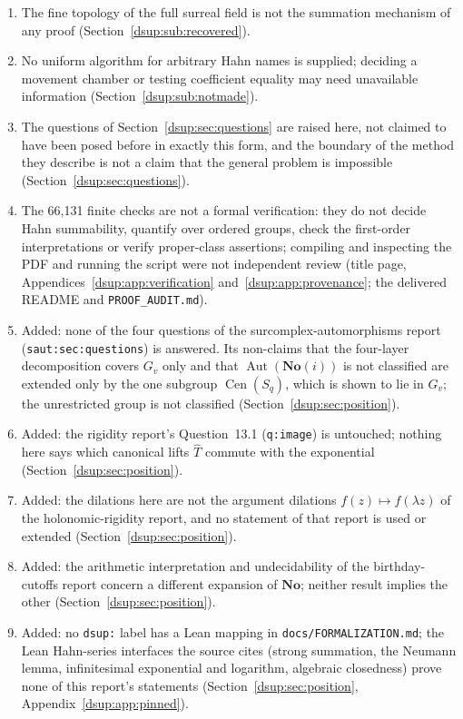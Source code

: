 \documentclass[11pt,oneside]{article}
\numberwithin{equation}{section}
\theoremstyle{definition}
\theoremstyle{remark}
\newcommand{\No}{\mathbf{No}}
\newcommand{\Aut}{\operatorname{Aut}}
\DeclareMathOperator{\Cen}{Cen}
\newcommand{\repo}[1]{\nolinkurl{#1}}%
\newcommand{\lbl}[1]{\nolinkurl{#1}}%
\begin{document}
\begin{enumerate}[label=\arabic*.,leftmargin=2.2em,itemsep=2pt]
\item The fine topology of the full surreal field is not the summation
mechanism of any proof (Section~\ref{dsup:sub:recovered}).
\item No uniform algorithm for arbitrary Hahn names is supplied; deciding a
movement chamber or testing coefficient equality may need unavailable
information (Section~\ref{dsup:sub:notmade}).
\item The questions of Section~\ref{dsup:sec:questions} are raised here, not
claimed to have been posed before in exactly this form, and the boundary of
the method they describe is not a claim that the general problem is
impossible (Section~\ref{dsup:sec:questions}).
\item The 66,131 finite checks are not a formal verification: they do not
decide Hahn summability, quantify over ordered groups, check the
first-order interpretations or verify proper-class assertions; compiling
and inspecting the PDF and running the script were not independent review
(title page, Appendices~\ref{dsup:app:verification}
and~\ref{dsup:app:provenance}; the delivered README and
\repo{PROOF_AUDIT.md}).
\item Added: none of the four questions of the surcomplex-automorphisms
report (\lbl{saut:sec:questions}) is answered. Its non-claims that the
four-layer decomposition covers $G_v$ only and that $\Aut(\No(i))$ is not
classified are extended only by the one subgroup $\Cen(S_q)$, which is
shown to lie in $G_v$; the unrestricted group is not classified
(Section~\ref{dsup:sec:position}).
\item Added: the rigidity report's Question~13.1 (\lbl{q:image}) is
untouched; nothing here says which canonical lifts $\widehat T$ commute with
the exponential (Section~\ref{dsup:sec:position}).
\item Added: the dilations here are not the argument dilations
$f(z)\mapsto f(\lambda z)$ of the holonomic-rigidity report, and no
statement of that report is used or extended
(Section~\ref{dsup:sec:position}).
\item Added: the arithmetic interpretation and undecidability of the
birthday-cutoffs report concern a different expansion of $\No$; neither
result implies the other (Section~\ref{dsup:sec:position}).
\item Added: no \texttt{dsup:} label has a Lean mapping in
\repo{docs/FORMALIZATION.md}; the Lean Hahn-series interfaces the source
cites (strong summation, the Neumann lemma, infinitesimal exponential and
logarithm, algebraic closedness) prove none of this report's statements
(Section~\ref{dsup:sec:position}, Appendix~\ref{dsup:app:pinned}).
\end{enumerate}
\end{document}
